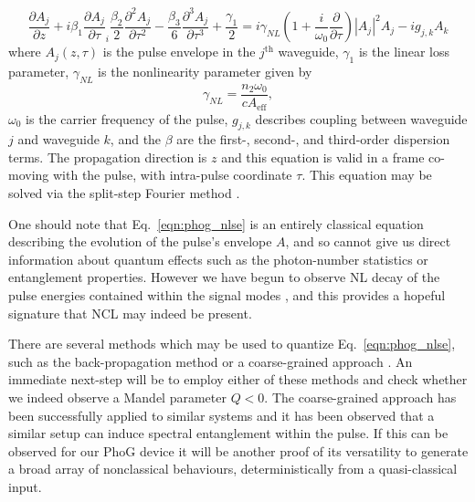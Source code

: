 \begin{equation}\label{eqn:phog_nlse}
\frac{\partial A_j}{\partial z} + i \beta_1 \frac{\partial A_j}{\partial \tau} _ i \frac{\beta_2}{2} \frac{\partial^2 A_j}{\partial \tau^2} - \frac{\beta_3}{6} \frac{\partial^3 A_j}{\partial \tau^3} + \frac{\gamma_1}{2} = i \gamma_{NL} \left( 1 + \frac{i}{\omega_0} \frac{\partial}{\partial \tau}\right)\left|A_j\right|^2 A_j - i g_{j, k} A_k
\end{equation}
where $A_j\left(z, \tau\right)$ is the pulse envelope in the $j^{\text{th}}$ waveguide, $\gamma_1$ is the linear loss parameter, $\gamma_{NL}$ is the nonlinearity parameter given by
\begin{equation}
\gamma_{NL} = \frac{n_2 \omega_0}{c A_{\text{eff}}},
\end{equation}
$\omega_0$ is the carrier frequency of the pulse, $g_{j, k}$ describes coupling between waveguide $j$ and waveguide $k$, and the $\beta$ are the first-, second-, and third-order dispersion terms. The propagation direction is $z$ and this equation is valid in a frame co-moving with the pulse, with intra-pulse coordinate $\tau$. This equation may be solved via the split-step Fourier method \cite{Agrawal2012}.

One should note that Eq.~\ref{eqn:phog_nlse} is an entirely classical equation describing the evolution of the pulse's envelope $A$, and so cannot give us direct information about quantum effects such as the photon-number statistics or entanglement properties. However we have begun to observe NL decay of the pulse energies contained within the signal modes \cite{Thornton2019a}, and this provides a hopeful signature that NCL may indeed be present.

There are several methods which may be used to quantize Eq.~\ref{eqn:phog_nlse}, such as the back-propagation method \cite{Lai1995, Hosaka2015, Mecozzi1997} or a coarse-grained approach \cite{Hosaka2016, Nishizawa1999, Fiorentino2002, Ju2012, Doerr1994}. An immediate next-step will be to employ either of these methods and check whether we indeed observe a Mandel parameter $Q < 0$. The coarse-grained approach has been successfully applied to similar systems and it has been observed \cite{Ju2012} that a similar setup can induce spectral entanglement within the pulse. If this can be observed for our PhoG device it will be another proof of its versatility to generate a broad array of nonclassical behaviours, deterministically from a quasi-classical input.


